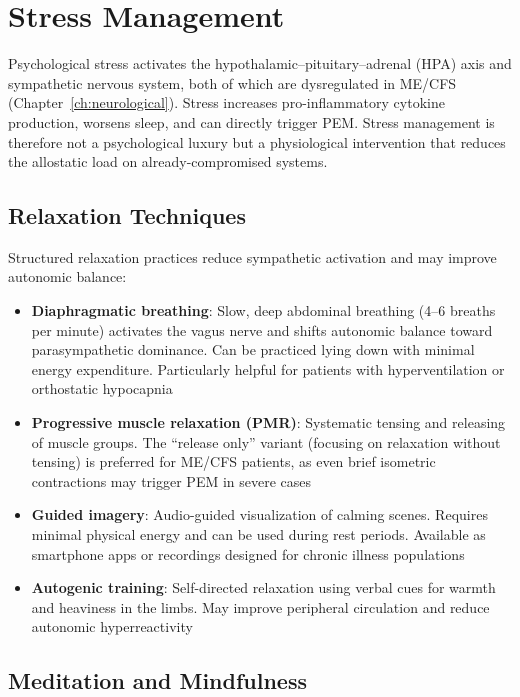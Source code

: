 \section{Stress Management}
\label{sec:stress-management}

Psychological stress activates the hypothalamic--pituitary--adrenal (HPA) axis and sympathetic nervous system, both of which are dysregulated in ME/CFS (Chapter~\ref{ch:neurological}). Stress increases pro-inflammatory cytokine production, worsens sleep, and can directly trigger PEM. Stress management is therefore not a psychological luxury but a physiological intervention that reduces the allostatic load on already-compromised systems.

\subsection{Relaxation Techniques}

Structured relaxation practices reduce sympathetic activation and may improve autonomic balance:

\begin{itemize}
    \item \textbf{Diaphragmatic breathing}: Slow, deep abdominal breathing (4--6 breaths per minute) activates the vagus nerve and shifts autonomic balance toward parasympathetic dominance. Can be practiced lying down with minimal energy expenditure. Particularly helpful for patients with hyperventilation or orthostatic hypocapnia
    \item \textbf{Progressive muscle relaxation (PMR)}: Systematic tensing and releasing of muscle groups. The ``release only'' variant (focusing on relaxation without tensing) is preferred for ME/CFS patients, as even brief isometric contractions may trigger PEM in severe cases
    \item \textbf{Guided imagery}: Audio-guided visualization of calming scenes. Requires minimal physical energy and can be used during rest periods. Available as smartphone apps or recordings designed for chronic illness populations
    \item \textbf{Autogenic training}: Self-directed relaxation using verbal cues for warmth and heaviness in the limbs. May improve peripheral circulation and reduce autonomic hyperreactivity
\end{itemize}

\subsection{Meditation and Mindfulness}

